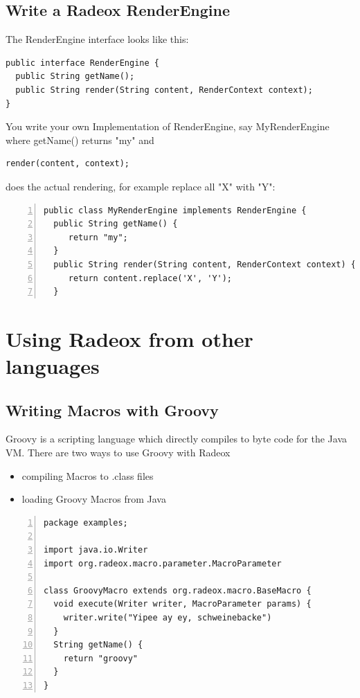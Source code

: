 \documentclass[a4paper,pdftex]{article}
\begin{document}
\subsection{Write a Radeox RenderEngine}

The RenderEngine interface looks like this:

\begin{verbatim}
public interface RenderEngine {
  public String getName();
  public String render(String content, RenderContext context);
}
\end{verbatim}

You write your own Implementation of RenderEngine, 
say MyRenderEngine where getName() returns "my" and 

\begin{verbatim}
render(content, context);
\end{verbatim}

does the actual rendering, for example replace all "X" with "Y":

\begin{Verbatim}[gobble=0,frame=single,numbers=left,fontsize=\small]
public class MyRenderEngine implements RenderEngine {
  public String getName() {
     return "my";
  }
  public String render(String content, RenderContext context) {
     return content.replace('X', 'Y'); 
  }
\end{Verbatim}

\section{Using Radeox from other languages}

\subsection{Writing Macros with Groovy}

Groovy\cite{Groovy} is a scripting language which directly 
compiles to byte code for the Java VM. There are two ways to use
Groovy with Radeox

\begin{itemize}
\item compiling Macros to .class files
\item loading Groovy Macros from Java
\end{itemize}

\begin{Verbatim}[gobble=0,frame=single,numbers=left,fontsize=\small]
package examples;

import java.io.Writer
import org.radeox.macro.parameter.MacroParameter

class GroovyMacro extends org.radeox.macro.BaseMacro {
  void execute(Writer writer, MacroParameter params) { 
    writer.write("Yipee ay ey, schweinebacke")
  }
  String getName() {
    return "groovy"
  }
}
\end{Verbatim}
\end{document}
